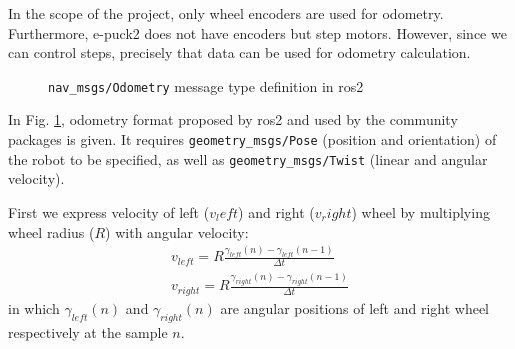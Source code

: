 In the scope of the project, only wheel encoders are used for odometry. Furthermore, e-puck2 does not have encoders but step motors. However, since we can control steps, precisely that data can be used for odometry calculation.

\begin{figure}[H]
    \centering
    \begin{subfigure}[b]{0.9\textwidth}
    \end{subfigure}
    \caption{\texttt{nav\_msgs/Odometry} message type definition in \ac{ros2}}
    \label{fig:simulation:odometry}
\end{figure}

In Fig. \ref{fig:simulation:odometry}, odometry format proposed by \ac{ros2} and used by the community packages is given. It requires \texttt{geometry\_msgs/Pose} (position and orientation) of the robot to be specified, as well as \texttt{geometry\_msgs/Twist} (linear and angular velocity).

First we express velocity of left ($v_left$) and right ($v_right$) wheel by multiplying wheel radius ($R$) with angular velocity:
\begin{equation}
\begin{aligned}
    v_{left} = R \frac{\gamma_{left}(n) - \gamma_{left}(n-1)}{\Delta t} \\
    v_{right} = R \frac{\gamma_{right}(n) - \gamma_{right}(n-1)}{\Delta t}
\end{aligned}
\end{equation}
in which $ \gamma_{left}(n) $ and $ \gamma_{right}(n) $ are angular positions of left and right wheel respectively at the sample $ n $.

